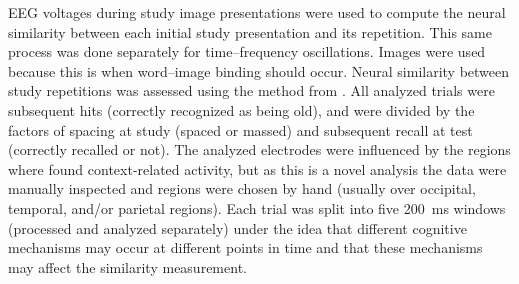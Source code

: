 EEG voltages during study image presentations were used to compute the neural similarity between each initial study presentation and its repetition.  This same process was done separately for time--frequency oscillations.  Images were used because this is when word--image binding
should occur.  Neural similarity between study repetitions was assessed using the method from .  All analyzed trials were subsequent hits (correctly recognized as being old), and were divided by the factors of spacing at study (spaced or massed) and subsequent recall at test (correctly recalled or not).
The analyzed electrodes were influenced by the regions where  found context-related activity, but as this is a novel analysis the data were manually inspected and regions were chosen by hand (usually over occipital, temporal, and/or parietal regions).  Each trial was split into five 200~ms windows (processed and analyzed separately) under the idea that different cognitive mechanisms may occur at different points in time and that these mechanisms may affect the similarity measurement.



